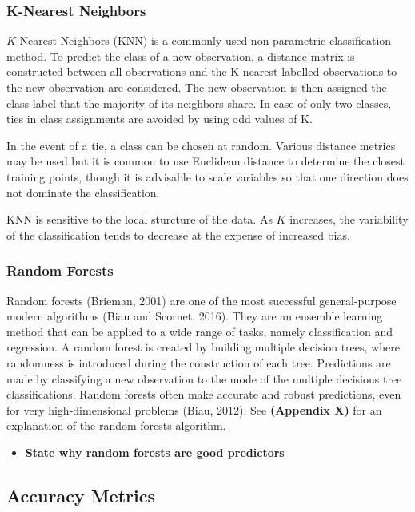\documentclass[12pt,]{article}
\providecommand{\tightlist}{%
  \setlength{\itemsep}{0pt}\setlength{\parskip}{0pt}}
\begin{document}
\subsubsection{K-Nearest Neighbors}\label{k-nearest-neighbors}

\(K\)-Nearest Neighbors (KNN) is a commonly used non-parametric
classification method. To predict the class of a new observation, a
distance matrix is constructed between all observations and the K
nearest labelled observations to the new observation are considered. The
new observation is then assigned the class label that the majority of
its neighbors share. In case of only two classes, ties in class
assignments are avoided by using odd values of K.

In the event of a tie, a class can be chosen at random. Various distance
metrics may be used but it is common to use Euclidean distance to
determine the closest training points, though it is advisable to scale
variables so that one direction does not dominate the classification.

KNN is sensitive to the local sturcture of the data. As \(K\) increases,
the variability of the classification tends to decrease at the expense
of increased bias.

\subsubsection{Random Forests}\label{random-forests}

Random forests (Brieman, 2001) are one of the most successful
general-purpose modern algorithms (Biau and Scornet, 2016). They are an
ensemble learning method that can be applied to a wide range of tasks,
namely classification and regression. A random forest is created by
building multiple decision trees, where randomness is introduced during
the construction of each tree. Predictions are made by classifying a new
observation to the mode of the multiple decisions tree classifications.
Random forests often make accurate and robust predictions, even for very
high-dimensional problems (Biau, 2012). See \textbf{(Appendix X)} for an
explanation of the random forests algorithm.

\begin{itemize}
\tightlist
\item
  \textbf{State why random forests are good predictors}
\end{itemize}

\subsection{Accuracy Metrics}\label{accuracy-metrics}
\end{document}
